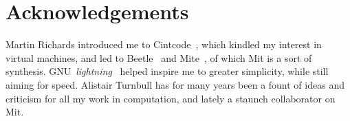 \documentclass[a4paper]{article}
\begin{document}
\section*{Acknowledgements}

Martin Richards introduced me to Cintcode~\cite{cintweb}, which
kindled my interest in virtual machines, and led to
Beetle~\cite{beetledis} and Mite~\cite{mite0},
of which Mit is a sort of synthesis.
GNU~\emph{lightning}~\cite{lightning} helped inspire me to greater
simplicity, while still aiming for speed. Alistair Turnbull
has for many years been a fount of ideas and criticism for all my work in computation, and lately a staunch collaborator on Mit.



\end{document}
